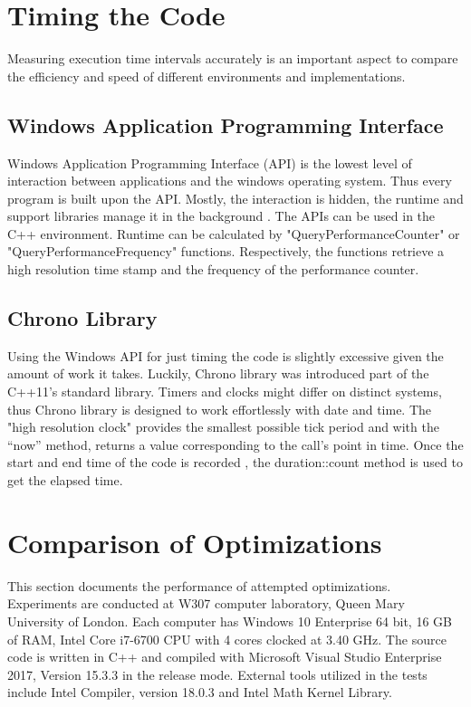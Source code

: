 \documentclass[12pt, oneside]{book}
\theoremstyle{plain}
\theoremstyle{definition}
\begin{document}
\section{Timing the Code}
Measuring execution time intervals accurately is an important aspect to compare the efficiency and speed of different environments and implementations.

\subsection{Windows Application Programming Interface}
Windows Application Programming Interface (API) is the lowest level of interaction between applications and the windows operating system. Thus every program is built upon  the API. Mostly, the interaction is hidden, the runtime and support libraries manage it in the background \cite{windows}. The APIs can be used in the C++ environment. Runtime can be calculated by "QueryPerformanceCounter" or "QueryPerformanceFrequency"  functions. Respectively, the functions retrieve a high resolution time stamp and the frequency of the performance counter. 

\subsection{Chrono Library}
Using the Windows API for just timing the code is slightly excessive given the amount of work it takes. Luckily, Chrono library was introduced part of the C++11’s standard library.  Timers and clocks might differ on distinct systems, thus Chrono library is designed to work effortlessly with date and time. The "high resolution clock" provides the smallest possible tick period and with the “now” method, returns a value corresponding to the call’s point in time.  Once the start and end time of the code is recorded ,  the duration::count method is used to get the elapsed time.


\section{Comparison of Optimizations}
This section documents the performance of attempted optimizations. Experiments  are  conducted  at  W307 computer laboratory, Queen Mary University of London.  Each computer has Windows 10 Enterprise 64 bit, 16 GB of RAM, Intel Core i7-6700 CPU with 4 cores clocked at 3.40 GHz.  The source code is written in C++ and compiled with Microsoft Visual Studio Enterprise 2017, Version 15.3.3 in the release mode. External tools  utilized  in  the  tests  include Intel Compiler, version 18.0.3 and Intel Math Kernel  Library. 
\end{document}
